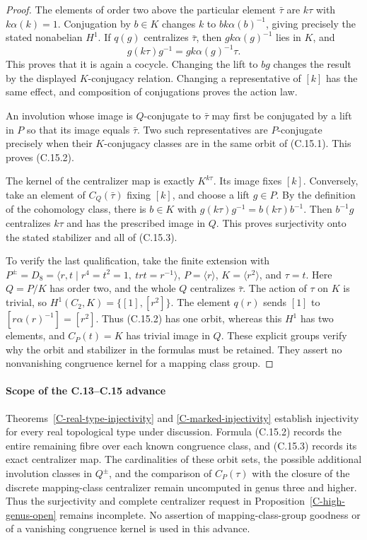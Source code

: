\documentclass[11pt,oneside]{article}
\begin{document}
\begin{proof}
The elements of order two above the particular element
$\bar\tau$ are $k\tau$ with $k\alpha(k)=1$.
Conjugation by $b\in K$ changes $k$ to
$bk\alpha(b)^{-1}$, giving precisely the stated
nonabelian $H^1$. If $q(g)$ centralizes $\bar\tau$, then
$gk\alpha(g)^{-1}$ lies in $K$, and
\[
 g(k\tau)g^{-1}=gk\alpha(g)^{-1}\tau.
\]
This proves that it is again a cocycle. Changing the lift to
$bg$ changes the result by the displayed $K$-conjugacy relation.
Changing a representative of $[k]$ has the same effect, and
composition of conjugations proves the action law.

An involution whose image is $Q$-conjugate to $\bar\tau$ may
first be conjugated by a lift in $P$ so that its image equals
$\bar\tau$. Two such representatives are $P$-conjugate
precisely when their $K$-conjugacy classes are in the same orbit
of (C.15.1). This proves (C.15.2).

The kernel of the centralizer map is exactly $K^{k\tau}$.
Its image fixes $[k]$. Conversely, take an element of $C_Q(\bar\tau)$
fixing $[k]$, and choose a lift $g\in P$. By the definition of
the cohomology class, there is $b\in K$ with
$g(k\tau)g^{-1}=b(k\tau)b^{-1}$. Then $b^{-1}g$ centralizes
$k\tau$ and has the prescribed image in $Q$. This proves
surjectivity onto the stated stabilizer and all of (C.15.3).

To verify the last qualification, take the finite extension with
$P^{\pm}=D_8=\langle r,t\mid r^4=t^2=1,\ trt=r^{-1}\rangle$,
$P=\langle r\rangle$, $K=\langle r^2\rangle$, and $\tau=t$.
Here $Q=P/K$ has order two, and the whole $Q$ centralizes
$\bar\tau$. The action of $\tau$ on $K$ is trivial, so
$H^1(C_2,K)=\{[1],[r^2]\}$. The element $q(r)$ sends $[1]$
to $[r\alpha(r)^{-1}]=[r^2]$. Thus (C.15.2) has one orbit,
whereas this $H^1$ has two elements, and
$C_P(t)=K$ has trivial image in $Q$. These explicit groups
verify why the orbit and stabilizer in the formulas must be
retained. They assert no nonvanishing congruence kernel for a
mapping class group.
\end{proof}

\paragraph{Scope of the C.13--C.15 advance}
Theorems~\ref{C-real-type-injectivity} and
\ref{C-marked-injectivity} establish injectivity for every real
topological type under discussion. Formula (C.15.2) records the
entire remaining fibre over each known congruence class, and
(C.15.3) records its exact centralizer map. The cardinalities of
these orbit sets, the possible additional involution classes in
$Q^{\pm}$, and the comparison of $C_P(\tau)$ with the closure
of the discrete mapping-class centralizer remain uncomputed in
genus three and higher. Thus the surjectivity and complete
centralizer request in Proposition~\ref{C-high-genus-open}
remains incomplete. No assertion of mapping-class-group goodness
or of a vanishing congruence kernel is used in this advance.
\end{document}

